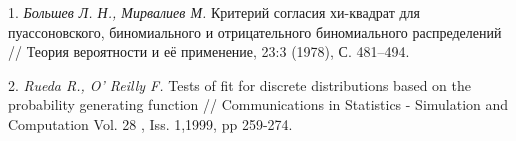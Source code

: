 \litlist

1. {\it Большев Л. Н., Мирвалиев М.} Критерий согласия хи-квадрат для пуассоновского, биномиального и отрицательного биномиального распределений // Теория вероятности и её применение, 23:3 (1978), С. 481--494.


2. {\it Rueda R., O' Reilly F.} Tests of fit for discrete distributions based on the probability generating function // Communications in Statistics - Simulation and Computation Vol. 28 , Iss. 1,1999, pp 259-274.
